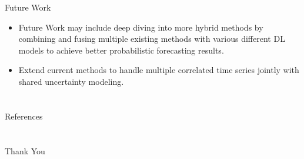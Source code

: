 \documentclass[xcolor=dvipsnames,aspectratio=169]{beamer}
\begin{document}
\begin{frame}{Future Work}
    \begin{itemize}
        \item Future Work may include deep diving into more hybrid methods by combining and fusing multiple existing methods with various different DL models to achieve better probabilistic forecasting results.

        \item Extend current methods to handle multiple correlated time series jointly with shared uncertainty modeling.
    \end{itemize}
\end{frame}




\section{}
\begin{frame}{References} 
\footnotesize
\begin{thebibliography}{99}


\nocite{*}

\end{thebibliography}
\end{frame}
\section{}
\begin{frame}{}
\LARGE
\centerline{Thank You}
    
\end{frame}


\end{document}
